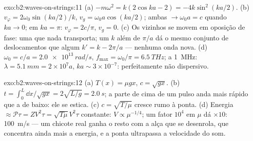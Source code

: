 \begin{solution}{exo:b2:waves-on-strings:11}
(a) $-m\omega^2 = k(2\cos ka - 2) = -4k\sin^2(ka/2)$. (b) $v_\varphi = 2\omega_0\sin(ka/2)
/k$, $v_g = \omega_0a\cos(ka/2)$; ambas $\to \omega_0a = c$ quando $ka \to 0$; em $ka = \pi$:
$v_\varphi = 2c/\pi$, $v_g = 0$. (c) Os vizinhos se movem em oposição de fase: uma  que nada transporta; um $k$ além de $\pi/a$ dá o mesmo conjunto de
deslocamentos que algum $k' = k - 2\pi/a$ --- nenhuma onda nova. (d) $\omega_0 = c/a =
\qty{2.0e13}{rad/s}$, $f_{\max} = \omega_0/\pi = \qty{6.5}{THz}$; a \qty{1}{MHz}: $\lambda =
\qty{5.1}{mm} = 2 \times 10^7a$, $ka \sim 3 \times 10^{-7}$: perfeitamente não dispersivo.
\end{solution}

\begin{solution}{exo:b2:waves-on-strings:12}
(a) $T(x) = \mu gx$, $c = \sqrt{gx}$. (b) $t = \int_0^L\dd x/\sqrt{gx} = 2\sqrt{L/g} =
\qty{2.0}{s}$; a parte de cima de um pulso anda mais rápido que a de baixo: ele
se estica. (c) $c = \sqrt{T/\mu}$ cresce rumo à ponta. (d) Energia $\approx
\mathcal P\tau = ZV^2\tau = \sqrt{T\mu}V^2\tau$ constante: $V \propto \mu^{-1/4}$; um
fator $10^4$ em $\mu$ dá $\times10$: \qty{100}{m/s} --- um chicote real ganha
o resto com a alça que se desenrola, que concentra ainda mais a
energia, e a ponta ultrapassa a velocidade do som.
\end{solution}

